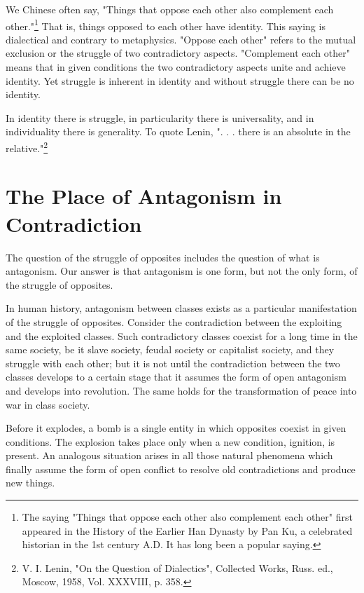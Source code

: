 \documentclass{article}
\begin{document}
We Chinese often say, "Things that oppose each other also complement each
other."\footnote{The saying "Things that oppose each other also complement each
other" first appeared in the History of the Earlier Han Dynasty by Pan Ku,
a celebrated historian in the 1st century A.D. It has long been a popular
saying.} That is, things opposed to each other have identity. This saying is
dialectical and contrary to metaphysics. "Oppose each other" refers to the
mutual exclusion or the struggle of two contradictory aspects. "Complement each
other" means that in given conditions the two contradictory aspects unite and
achieve identity. Yet struggle is inherent in identity and without struggle
there can be no identity.

In identity there is struggle, in particularity there is universality, and in
individuality there is generality. To quote Lenin, ". . . there is an absolute
in the relative."\footnote{V. I. Lenin, "On the Question of Dialectics",
Collected Works, Russ. ed., Moscow, 1958, Vol. XXXVIII, p. 358.}

\section{The Place of Antagonism in Contradiction}

The question of the struggle of opposites includes the question of what is
antagonism. Our answer is that antagonism is one form, but not the only form,
of the struggle of opposites.

In human history, antagonism between classes exists as a particular
manifestation of the struggle of opposites. Consider the contradiction between
the exploiting and the exploited classes. Such contradictory classes coexist
for a long time in the same society, be it slave society, feudal society or
    capitalist society, and they struggle with each other; but it is not until
    the contradiction between the two classes develops to a certain stage that
    it assumes the form of open antagonism and develops into revolution. The
    same holds for the transformation of peace into war in class society.

Before it explodes, a bomb is a single entity in which opposites coexist in
given conditions. The explosion takes place only when a new condition,
ignition, is present. An analogous situation arises in all those natural
phenomena which finally assume the form of open conflict to resolve old
contradictions and produce new things.
\end{document}
